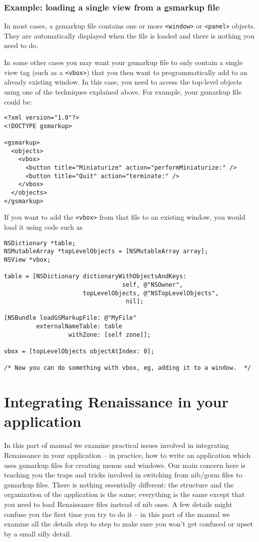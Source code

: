 \subsubsection{Example: loading a single view from a gsmarkup file}
In most cases, a gsmarkup file contains one or more \texttt{<window>}
or \texttt{<panel>} objects.  They are automatically displayed when
the file is loaded and there is nothing you need to do.

In some other cases you may want your gsmarkup file to only contain a
single view tag (such as a \texttt{<vbox>}) that you then want to
programmatically add to an already existing window.  In this case, you
need to access the top-level objects using one of the techniques
explained above.  For example, your gsmarkup file could be:
\begin{verbatim}
<?xml version="1.0"?>
<!DOCTYPE gsmarkup>

<gsmarkup>
  <objects>
    <vbox>
      <button title="Miniaturize" action="performMiniaturize:" />
      <button title="Quit" action="terminate:" />
    </vbox>
  </objects>
</gsmarkup>
\end{verbatim}

If you want to add the \texttt{<vbox>} from that file to an existing
window, you would load it using code such as
\begin{verbatim}
NSDictionary *table;
NSMutableArray *topLevelObjects = [NSMutableArray array];
NSView *vbox;

table = [NSDictionary dictionaryWithObjectsAndKeys: 
                                 self, @"NSOwner",
                      topLevelObjects, @"NSTopLevelObjects",
                                  nil];

[NSBundle loadGSMarkupFile: @"MyFile"
         externalNameTable: table
                  withZone: [self zone]];

vbox = [topLevelObjects objectAtIndex: 0];

/* Now you can do something with vbox, eg, adding it to a window.  */
\end{verbatim}

\section{Integrating Renaissance in your application}
In this part of manual we examine practical issues involved in
integrating Renaissance in your application -- in practice, how to
write an application which uses gsmarkup files for creating menus and
windows.  Our main concern here is teaching you the traps and tricks
involved in switching from nib/gorm files to gsmarkup files.  There is
nothing essentially different: the structure and the organization of
the application is the same; everything is the same except that you
need to load Renaissance files instead of nib ones.  A few details
might confuse you the first time you try to do it -- in this part of
the manual we examine all the details step to step to make sure you
won't get confused or upset by a small silly detail.

